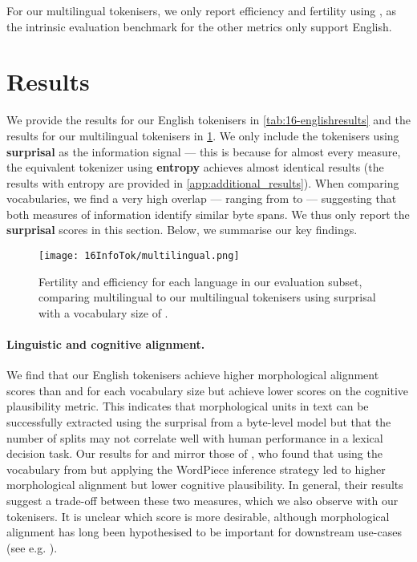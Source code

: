 For our multilingual tokenisers, we only report \renyi efficiency and fertility using \commoncorpus, as the intrinsic evaluation benchmark for the other metrics only support English.

\section{Results}\label{sec:16-results}

We provide the results for our English tokenisers in \cref{tab:16-englishresults} and the results for our multilingual tokenisers in \cref{fig:16-multilingual}. We only include the \tokname tokenisers using \textbf{surprisal} as the information signal --- this is because for almost every measure, the equivalent tokenizer using \textbf{entropy} achieves almost identical results (the results with entropy are provided in \cref{app:additional_results}). When comparing vocabularies, we find a very high overlap --- ranging from  to  --- suggesting that both measures of information identify similar byte spans. We thus only report the \textbf{surprisal} scores in this section. Below, we summarise our key findings.

\begin{figure}[!t]
    \centering
    \texttt{[image: 16InfoTok/multilingual.png]}
    \caption{Fertility and \renyi efficiency for each language in our \commoncorpus evaluation subset, comparing multilingual \bpe to our multilingual \tokname tokenisers using surprisal with a vocabulary size of .}
    \label{fig:16-multilingual}
\end{figure}

\paragraph{Linguistic and cognitive alignment.}

We find that our English \tokname tokenisers achieve higher morphological alignment scores than \bpe and \bpewp for each vocabulary size but achieve lower scores on the cognitive plausibility metric. This indicates that morphological units in text can be successfully extracted using the surprisal from a byte-level model but that the number of splits may not correlate well with human performance in a lexical decision task. Our results for \bpe and \bpewp mirror those of \citet{uzan-etal-2024-greed}, who found that using the vocabulary from \bpe but applying the WordPiece inference strategy led to higher morphological alignment but lower cognitive plausibility. In general, their results suggest a trade-off between these two measures, which we also observe with our tokenisers. It is unclear which score is more desirable, although morphological alignment has long been hypothesised to be important for downstream use-cases (see e.g. \citet{gow-smith-etal-2022-improving}).

